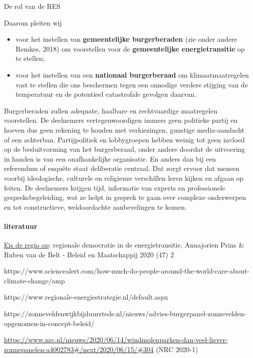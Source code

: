 \begin{voorstel}{De rol van de RES}
\begin{aanbevelingen}
Daarom pleiten wij
\begin{itemize}
	\item voor het instellen van \textbf{gemeentelijke burgerberaden} (zie onder andere Remkes, 2018) om voorstellen voor de \textbf{gemeentelijke energietransitie} op te stellen;
	\item voor het instellen van een \textbf{nationaal burgerberaad} om klimaatmaatregelen vast te stellen die ons beschermen tegen een onnodige verdere stijging van de temperatuur en de potentieel catastrofale gevolgen daarvan.
\end{itemize}
Burgerberaden zullen adequate, haalbare en rechtvaardige maatregelen voorstellen. De deelnemers vertegenwoordigen immers geen politieke partij en hoeven dus geen rekening te houden met verkiezingen, gunstige media-aandacht of een achterban. Partijpolitiek en lobbygroepen hebben weinig tot geen invloed op de besluitvorming van het burgerberaad, onder andere doordat de uitvoering in handen is van een onafhankelijke organisatie. En anders dan bij een referendum of enquête staat deliberatie centraal. Dat zorgt ervoor dat mensen voorbij ideologische, culturele en religieuze verschillen leren kijken en afgaan op feiten. De deelnemers krijgen tijd, informatie van experts en professionele gespreksbegeleiding, wat ze helpt in gesprek te gaan over complexe onderwerpen en tot constructieve, weldoordachte aanbevelingen te komen.
\end{aanbevelingen}

\paragraph{literatuur}

\href{https://energievoordrenthe.nl/toolkit/volksvertegenwoordigers/HandlerDownloadFiles.ashx?idnv=1688984}{Eis de regio op}: regionale democratie in de energietransitie, Annajorien Prins \& Ruben van de Belt - Beleid en Maatschappij 2020 (47) 2

https://www.sciencealert.com/how-much-do-people-around-the-world-care-about-climate-change/amp

https://www.regionale-energiestrategie.nl/default.aspx

https://zonneveldenwijkbijduurstede.nl/nieuws/advies-burgerpanel-zonnevelden-opgenomen-in-concept-beleid/

\url{https://www.nrc.nl/nieuws/2020/06/14/windmolenparken-dan-veel-liever-zonnepanelen-a4002783#/next/2020/06/15/#304} (NRC 2020-1)


\end{voorstel}
